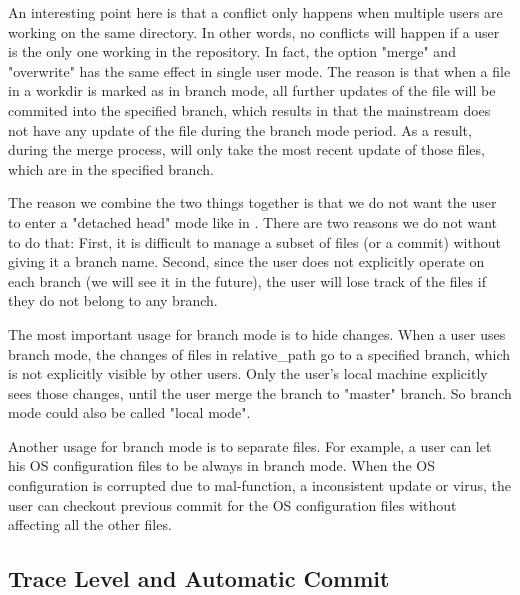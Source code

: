 An interesting point here is that a conflict only happens when multiple users
are working on the same directory. In other words, no conflicts will happen if a
user is the only one working in the repository. In fact, the option "merge" and
"overwrite" has the same effect in single user mode. The reason is that when a
file in a workdir is marked as in branch mode, all further updates of the file
will be commited into the specified branch, which results in that the mainstream
does not have any update of the file during the branch mode period. As a result,
during the merge process, \sys will only take the most recent update of those
files, which are in the specified branch.

The reason we combine the two things together is that we do not want the
user to enter a "detached head" mode like in \git\cite{git}. There are two reasons we do not want to do that: First, it is
difficult to manage a subset of files (or a commit) without giving it a branch
name. Second, since the user does not explicitly operate on each branch (we will
see it in the future), the user will lose track of the files if they do not
belong to any branch.

The most important usage for branch mode is to hide changes. When a user
uses branch mode, the changes of files in relative\_path go to a specified
branch, which is not explicitly visible by other users. Only the user's local
machine explicitly sees those changes, until the user merge the branch to
"master" branch. So branch mode could also be called "local mode".

Another usage for branch mode is to separate files. For example, a user can
let his OS configuration files to be always in branch mode. When the OS
configuration is corrupted due to mal-function, a inconsistent update or virus,
the user can checkout previous commit for the OS configuration files without
affecting all the other files.


\subsection{Trace Level and Automatic Commit}

